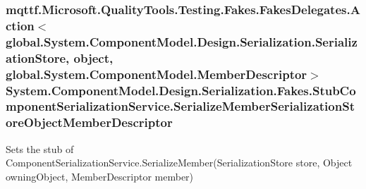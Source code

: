 \hypertarget{class_system_1_1_component_model_1_1_design_1_1_serialization_1_1_fakes_1_1_stub_component_serialization_service_a3c3a5a714e7f35ca8ed772a3584b7385}{
\subsubsection[{Serialize\-Member\-Serialization\-Store\-Object\-Member\-Descriptor}]{\setlength{\rightskip}{0pt plus 5cm}mqttf.\-Microsoft.\-Quality\-Tools.\-Testing.\-Fakes.\-Fakes\-Delegates.\-Action$<$global.\-System.\-Component\-Model.\-Design.\-Serialization.\-Serialization\-Store, object, global.\-System.\-Component\-Model.\-Member\-Descriptor$>$ System.\-Component\-Model.\-Design.\-Serialization.\-Fakes.\-Stub\-Component\-Serialization\-Service.\-Serialize\-Member\-Serialization\-Store\-Object\-Member\-Descriptor}}\label{class_system_1_1_component_model_1_1_design_1_1_serialization_1_1_fakes_1_1_stub_component_serialization_service_a3c3a5a714e7f35ca8ed772a3584b7385}


Sets the stub of Component\-Serialization\-Service.\-Serialize\-Member(\-Serialization\-Store store, Object owning\-Object, Member\-Descriptor member)

